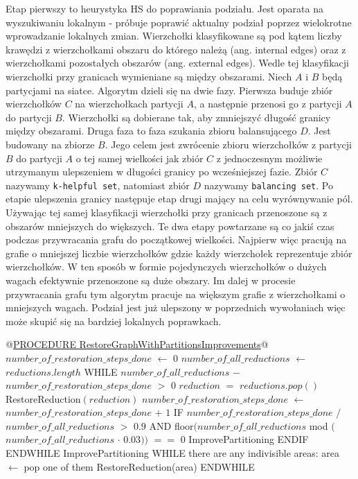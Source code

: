 Etap pierwszy to heurystyka HS do poprawiania podziału. Jest oparata na wyszukiwaniu lokalnym -
próbuje poprawić aktualny podział poprzez wielokrotne wprowadzanie lokalnych zmian. Wierzchołki klasyfikowane są
pod kątem liczby krawędzi z wierzchołkami obszaru do którego należą (ang. internal edges) oraz z wierzchołkami
pozostałych obszarów (ang. external edges).
Wedle tej klasyfikacji wierzchołki przy granicach wymieniane są między obszarami.
Niech $A$ i $B$ będą partycjami na siatce.
Algorytm dzieli się na dwie fazy.
Pierwsza buduje zbiór wierzchołków $C$ na wierzchołkach partycji $A$, a następnie przenosi go z partycji $A$ do partycji $B$.
Wierzchołki są dobierane tak, aby zmniejszyć długość granicy między obszarami.
Druga faza to faza szukania zbioru balansującego $D$.
Jest budowany na zbiorze $B$.
Jego celem jest zwrócenie zbioru wierzchołków z partycji $B$ do partycji $A$ o tej samej wielkości jak zbiór $C$
z jednoczesnym możliwie utrzymanym ulepszeniem w długości granicy po wcześniejszej fazie.
Zbiór $C$ nazywamy \texttt{k-helpful set}, natomiast zbiór $D$ nazywamy \texttt{balancing set}.
Po etapie ulepszenia granicy następuje etap drugi mający na celu wyrównywanie pól.
Używając tej samej klasyfikacji wierzchołki przy granicach przenoszone są z obszarów mniejszych do większych.
Te dwa etapy powtarzane są co jakiś czas podczas przywracania grafu do początkowej wielkości.
Najpierw więc pracują na grafie o mniejszej liczbie wierzchołków gdzie każdy wierzchołek reprezentuje zbiór wierzchołków.
W ten sposób w formie pojedynczych wierzchołków o dużych wagach efektywnie przenoszone są duże obszary.
Im dalej w procesie przywracania grafu tym algorytm pracuje na większym grafie z wierzchołkami o mniejszych wagach.
Podział jest już ulepszony w poprzednich wywołaniach więc może skupić się na bardziej lokalnych poprawkach.
\newpage
\begin{pseudocode}
@\underline{PROCEDURE RestoreGraphWithPartitionsImprovements}@
  $number\_of\_restoration\_steps\_done$ $\leftarrow$ $0$
  $number\_of\_all\_reductions$ $\leftarrow$ $reductions$.$length$
  WHILE $number\_of\_all\_reductions$ $-$ $number\_of\_restoration\_steps\_done$ $>$ $0$
    $reduction$ $=$ $reductions$.$pop()$
    RestoreReduction$(reduction)$
    $number\_of\_restoration\_steps\_done$ $\leftarrow$ $number\_of\_restoration\_steps\_done$ $+$ $1$
    IF $number\_of\_restoration\_steps\_done$ $/$ $number\_of\_all\_reductions$ $>$ $0.9$ AND
       floor$(number\_of\_all\_reductions$ mod $($$number\_of\_all\_reductions$ $\cdot$ $0.03))$ $==$ $0$
      ImprovePartitioning
    ENDIF
  ENDWHILE
  ImprovePartitioning
  WHILE there are any indivisible areas:
    area $\leftarrow$ pop one of them
    RestoreReduction(area)
  ENDWHILE
\end{pseudocode}
